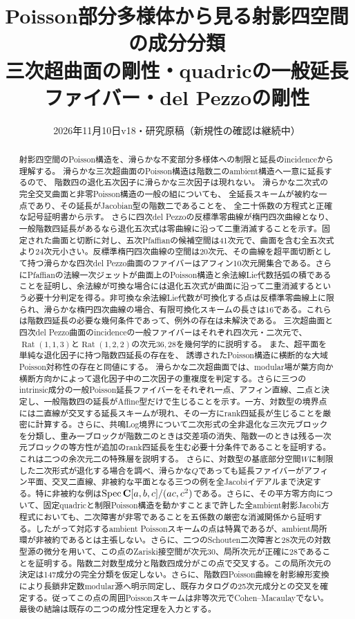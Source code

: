 \documentclass[a4paper,11pt]{ltjsarticle}
\title{Poisson部分多様体から見る射影四空間の成分分類\\
\large 三次超曲面の剛性・quadricの一般延長ファイバー・del Pezzoの剛性}
\author{}
\date{2026年11月10日\quad v18・研究原稿（新規性の確認は継続中）}
\theoremstyle{definition}
\theoremstyle{definition}\newtheorem{definition}[theorem]{定義}
\theoremstyle{remark}\newtheorem{remark}[theorem]{注意}
\newcommand{\Rat}{\operatorname{Rat}}\newcommand{\Gr}{\operatorname{Gr}}
\begin{document}
\maketitle
\begin{abstract}
射影四空間のPoisson構造を、滑らかな不変部分多様体への制限と延長のincidenceから理解する。
滑らかな三次超曲面のPoisson構造は階数二のambient構造へ一意に延長するので、
階数四の退化五次因子に滑らかな三次因子は現れない。
滑らかな二次式の完全交叉曲面と非零Poisson構造の一般の組についても、
全延長スキームが被約な一点であり、その延長がJacobian型の階数二であることを、
全二十係数の方程式と正確な記号証明書から示す。
さらに四次del Pezzoの反標準零曲線が楕円四次曲線となり、一般階数四延長があるなら退化五次式は零曲線に沿って二重消滅することを示す。固定された曲面と切断に対し、五次Pfaffianの候補空間は41次元で、曲面を含む全五次式より24次元小さい。反標準楕円四次曲線の空間は20次元、その曲線を超平面切断として持つ滑らかな四次del Pezzo曲面のファイバーはアフィン10次元開集合である。さらにPfaffianの法線一次ジェットが曲面上のPoisson構造と余法線Lie代数括弧の積であることを証明し、余法線が可換な場合には退化五次式が曲面に沿って二重消滅するという必要十分判定を得る。非可換な余法線Lie代数が可換化する点は反標準零曲線上に限られ、滑らかな楕円四次曲線の場合、有限可換化スキームの長さは16である。これらは階数四延長の必要な幾何条件であって、例外の存在は未解決である。
三次超曲面と四次del Pezzo曲面のincidenceの一般ファイバーはそれぞれ四次元・二次元で、
$\Rat(1,1,3)$と$\Rat(1,2,2)$の次元$36,28$を幾何学的に説明する。
また、超平面を単純な退化因子に持つ階数四延長の存在を、
誘導されたPoisson構造に横断的な大域Poisson対称性の存在と同値にする。
滑らかな二次超曲面では、modular場が葉方向か横断方向かによって退化因子中の二次因子の重複度を判定する。さらに三つのintrinsic成分の一般Poisson延長ファイバーをそれぞれ一点、アフィン直線、二点と決定し、一般階数四の延長がAffine型だけで生じることを示す。一方、対数型の境界点には二直線が交叉する延長スキームが現れ、その一方にrank四延長が生じることを厳密に計算する。さらに、共鳴Log境界について二次形式の全非退化な三次元ブロックを分類し、重み一ブロックが階数二のときは交差項の消失、階数一のときは残る一次元ブロックの等方性が追加のrank四延長を生む必要十分条件であることを証明する。これは二つの余次元二の特殊層を説明する。
さらに、対数型の基底部分空間$W$に制限した二次形式が退化する場合を調べ、滑らかな$Q$であっても延長ファイバーがアフィン平面、交叉二直線、非被約な平面となる三つの例を全Jacobiイデアルまで決定する。特に非被約な例は$\operatorname{Spec}\mathbf C[a,b,c]/(ac,c^2)$である。さらに、その平方零方向について、固定quadricと制限Poisson構造を動かすことまで許した全ambient射影Jacobi方程式においても、二次障害が非零であることを五係数の厳密な消滅関係から証明する。したがって対応するambient Poissonスキームの点は特異であるが、ambient局所環が非被約であるとは主張しない。さらに、二つのSchouten二次障害と28次元の対数型源の微分を用いて、この点のZariski接空間が次元30、局所次元が正確に28であることを証明する。階数二対数型成分と階数四成分がこの点で交叉する。この局所次元の決定は147成分の完全分類を仮定しない。さらに、階数四Poisson曲線を射影線形変換により長鎖非定数modular源へ明示同定し、既存カタログの25次元成分との交叉を確定する。従ってこの点の周囲Poissonスキームは非等次元でCohen--Macaulayでない。最後の結論は既存の二つの成分性定理を入力とする。

\end{abstract}
\end{document}
